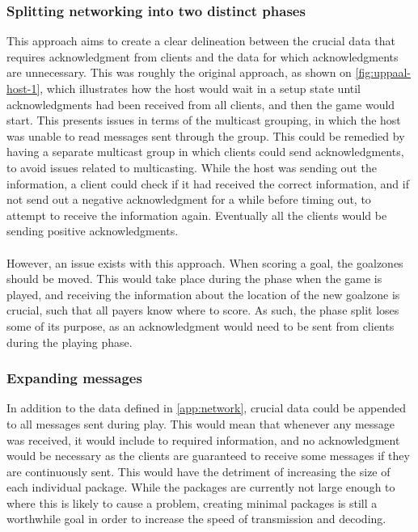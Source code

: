 \subsubsection{Splitting networking into two distinct phases}
This approach aims to create a clear delineation between the crucial data that requires acknowledgment from clients and the data for which acknowledgments are unnecessary.
This was roughly the original approach, as shown on \autoref{fig:uppaal-host-1}, which illustrates how the host would wait in a setup state until acknowledgments had been received from all clients, and then the game would start.
This presents issues in terms of the multicast grouping, in which the host was unable to read messages sent through the group.
This could be remedied by having a separate multicast group in which clients could send acknowledgments, to avoid issues related to multicasting.
While the host was sending out the information, a client could check if it had received the correct information, and if not send out a negative acknowledgment for a while before timing out, to attempt to receive the information again.
Eventually all the clients would be sending positive acknowledgments.
\\\\
However, an issue exists with this approach.
When scoring a goal, the goalzones should be moved.
This would take place during the phase when the game is played, and receiving the information about the location of the new goalzone is crucial, such that all payers know where to score.
As such, the phase split loses some of its purpose, as an acknowledgment would need to be sent from clients during the playing phase.

\subsubsection{Expanding messages}
In addition to the data defined in \autoref{app:network}, crucial data could be appended to all messages sent during play.
This would mean that whenever any message was received, it would include to required information, and no acknowledgment would be necessary as the clients are guaranteed to receive some messages if they are continuously sent.
This would have the detriment of increasing the size of each individual package.
While the packages are currently not large enough to where this is likely to cause a problem, creating minimal packages is still a worthwhile goal in order to increase the speed of transmission and decoding.


